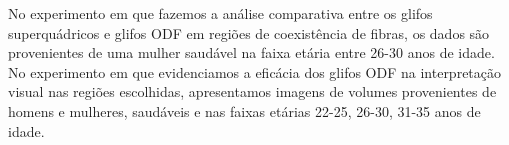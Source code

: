 No experimento em que fazemos a análise comparativa entre os glifos superquádricos e glifos ODF em regiões de coexistência de fibras, os dados são provenientes de uma mulher saudável na faixa etária entre 26-30 anos de idade. No experimento em que evidenciamos a eficácia dos glifos ODF na interpretação visual nas regiões escolhidas, apresentamos imagens de volumes provenientes de homens e mulheres, saudáveis e nas faixas etárias 22-25, 26-30, 31-35 anos de idade.







